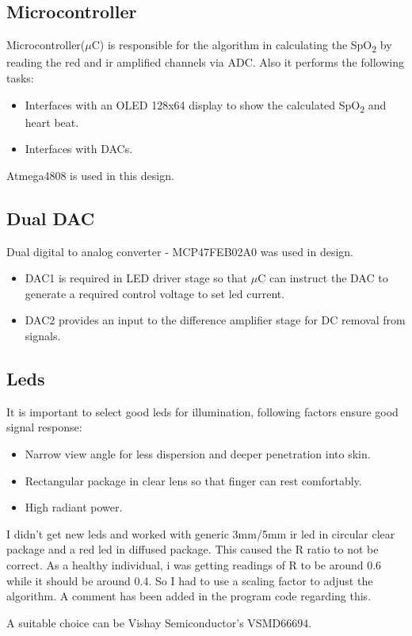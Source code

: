 	\pagebreak
	
	\subsection{Microcontroller}
	
		Microcontroller($\mu$C) is responsible for the algorithm in calculating the SpO\textsubscript{2} by reading the red and ir amplified channels via ADC. Also it performs the following tasks:
		
		\begin{itemize}
			\item Interfaces with an OLED 128x64 display to show the calculated  SpO\textsubscript{2} and heart beat.
			
			\item Interfaces with DACs.
		\end{itemize}
		
		Atmega4808 is used in this design.
	
	\subsection{Dual DAC}
	
		Dual digital to analog converter - MCP47FEB02A0 was used in design.
		
		\begin{itemize}
			
			\item DAC1 is required in LED driver stage so that $\mu$C can instruct the DAC to generate a required control voltage to set led current.
			
			\item DAC2 provides an input to the difference amplifier stage for DC removal from signals.
		
		\end{itemize}
		
	\subsection{Leds}
		It is important to select good leds for illumination, following factors ensure good signal response:
		
		\begin{itemize}
			\item Narrow view angle for less dispersion and deeper penetration into skin.
			\item Rectangular package in clear lens so that finger can rest comfortably.
			\item High radiant power.
		\end{itemize}
	
		I didn't get new leds and worked with generic 3mm/5mm ir led in circular clear package and a red led in diffused package. This caused the R ratio to not be correct. As a healthy individual, i was getting readings of R to be around 0.6 while it should be around 0.4. So I had to use a scaling factor to adjust the algorithm. A comment has been added in the program code regarding this. 
		
		A suitable choice can be Vishay Semiconductor's VSMD66694.
	
		  
	